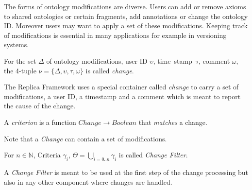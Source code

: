 The forms of ontology modifications are diverse. Users can add or
remove axioms to shared ontologies or certain fragments, add annotations
or change the ontology ID. Moreover users may want to apply a set of these
modifications. Keeping track of modifications is essential in many applications
for example in versioning systems.

\begin{definition}[Change]
For the set $\Delta$ of ontology modifications, user ID $\upsilon$,
time~stamp~$\tau$, comment $\omega$, the 4-tuple 
$\mathcal{\nu} = \{\Delta, \upsilon, \tau, \omega \}$ is called \emph{change}.
\end{definition}
The Replica Framework uses a special container called \emph{change} to
carry a set of modifications, a user ID, a timestamp and a comment which
is meant to report the cause of the change.

\begin{definition}[Criterion] 
A \emph{criterion} is a function $Change \to Boolean$ that
 \emph{matches} a change.

\end{definition}
Note that a \emph{Change} can contain a set of modifications.

\begin{definition}
For $n \in \mathbb{N}$, Criteria $\gamma_i$, 
$\Theta = \bigcup_{i=0..n} \gamma_i$ is called \emph{Change Filter}.
\end{definition}
A \emph{Change Filter} is meant to be used at the first step of the change
processing but also in any other component where changes are handled.

